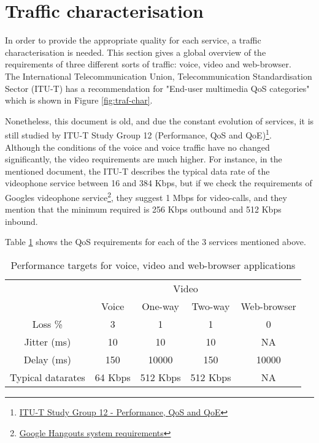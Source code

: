 \section{Traffic characterisation}
\label{sec:traf-char}

In order to provide the appropriate quality for each service, a traffic characterisation is needed. This section gives a global overview of the requirements of three different sorts of traffic: voice, video and web-browser.\\ 

The International Telecommunication Union, Telecommunication Standardisation Sector (ITU-T) has a recommendation for "End-user multimedia QoS categories"\cite{ituG1010} which is shown in Figure \ref{fig:traf-char}. 


Nonetheless, this document is old, and due the constant evolution of services, it is still studied by ITU-T Study Group 12 (Performance, QoS and QoE)\footnote{\href{http://www.itu.int/en/ITU-T/about/groups/Pages/sg12.aspx}{ITU-T Study Group 12 - Performance, QoS and QoE}}.\\ 

Although the conditions of the voice and voice traffic have no changed significantly, the video requirements are much higher. For instance, in the mentioned document, the ITU-T describes the typical data rate of the videophone service between 16 and 384 Kbps, but if we check the requirements of Googles videophone service\footnote{\href{https://support.google.com/plus/answer/1216376?hl=en}{Google Hangouts system requirements}}, they suggest 1 Mbps for video-calls, and they mention that the minimum required is 256 Kbps outbound and 512 Kbps inbound.   

Table \ref{table:trafchar} shows the QoS requirements for each of the 3 services mentioned above.

\begin{table}[ht] 
\caption{Performance targets for voice, video and web-browser applications} %
\centering %
\begin{tabular}{c || c c c c} %
\hline\hline %
& &\multicolumn{2}{c}{Video} \\ \cline{3-4}
  & Voice & One-way & Two-way & Web-browser \\ [0.5ex] %
\hline %
Loss \% & 3 & 1 & 1 & 0 \\   \hline %
Jitter (ms) & 10 & 10 & 10 & NA \\   \hline
Delay (ms) & 150 & 10000 & 150 & 10000 \\   \hline
Typical datarates & 64 Kbps & 512 Kbps & 512 Kbps & NA \\ [1ex] %
\hline %
\end{tabular} 
\label{table:trafchar} %
\end{table}